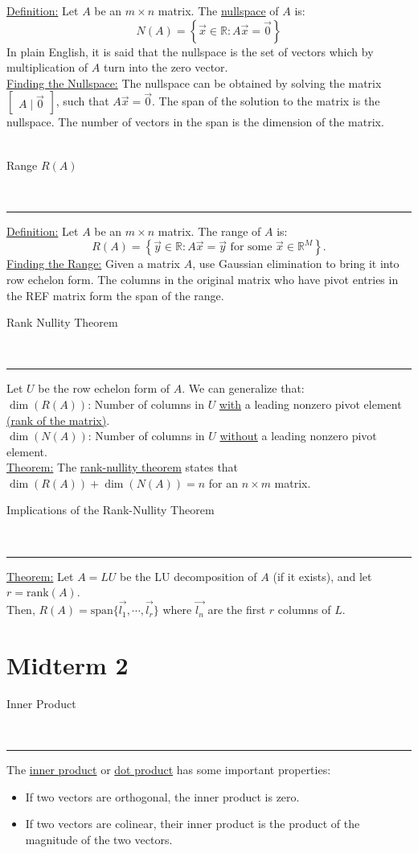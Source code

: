 \documentclass{article}
\newcommand{\header}[1]{\begin{large}\noindent #1\end{large}\\\rule{\textwidth}{0.5pt}}
\newcommand{\gap}{\medskip\\}
\begin{document}
\underline{Definition:} Let $A$ be an $m\times n$ matrix. The \underline{nullspace} of $A$ is:
\[
    N(A) = \left\{\vec{x} \in \mathbb{R} : A\vec{x} = \vec{0}\right\} 
\]
In plain English, it is said that the nullspace is the set of vectors which by multiplication
of $A$ turn into the zero vector.
\gap
\underline{Finding the Nullspace:} The nullspace can be obtained by solving the matrix
$\begin{bmatrix}
    A \mid \vec{0}
\end{bmatrix}$, such that $A\vec{x} = \vec{0}$. The span of the solution to the matrix
is the nullspace. The number of vectors in the span is the dimension of the matrix.
\\
\pagebreak
\\
\header{Range $R(A)$}

\underline{Definition:} Let $A$ be an $m\times n$ matrix. The range of $A$ is:
\[
    R(A) = \left\{\vec{y} \in \mathbb{R} : A\vec{x} = \vec{y} \textrm{ for some } \vec{x} \in \mathbb{R}^M \right\}.
\]
\underline{Finding the Range:} Given a matrix $A$, use Gaussian elimination to bring
it into row echelon form. The columns in the original matrix who have pivot entries
in the REF matrix form the span of the range.
\gap
\header{Rank Nullity Theorem}
Let $U$ be the row echelon form of $A$. We can generalize that:
\gap
$\dim(R(A))$: Number of columns in $U$ \underline{with} a leading nonzero pivot element \underline{(rank of the matrix)}.
\gap
$\dim(N(A))$: Number of columns in $U$ \underline{without} a leading nonzero pivot element.
\gap
\underline{Theorem:} The \underline{rank-nullity theorem} states that $\dim(R(A)) + \dim(N(A)) = n$
for an $n \times m$ matrix. 
\gap
\header{Implications of the Rank-Nullity Theorem}
\underline{Theorem:} Let $A=LU$ be the LU decomposition of $A$ (if it exists),
and let $r = \textrm{rank}(A)$.
\smallskip\\
Then, $R(A) = \textrm{span}\{\vec{l_1}, \cdots, \vec{l_r} \}$ where $\vec{l_n}$ are
the first $r$ columns of $L$.

\pagebreak

\section*{Midterm 2}

\header{Inner Product}

The \underline{inner product} or \underline{dot product} has some important
properties:
\begin{itemize}
    \item If two vectors are orthogonal, the inner product is zero.
    \item If two vectors are colinear, their inner product is the product of the 
    magnitude of the two vectors.
\end{itemize}
\end{document}

